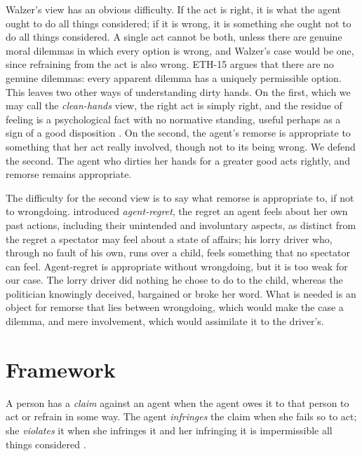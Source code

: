 \documentclass{situationist-preprint}
\begin{document}
Walzer's view has an obvious difficulty. If the act is right, it is what the agent ought to do all things considered; if it is wrong, it is something she ought not to do all things considered. A single act cannot be both, unless there are genuine moral dilemmas in which every option is wrong, and Walzer's case would be one, since refraining from the act is also wrong. ETH-15 argues that there are no genuine dilemmas: every apparent dilemma has a uniquely permissible option. This leaves two other ways of understanding dirty hands. On the first, which we may call the \emph{clean-hands} view, the right act is simply right, and the residue of feeling is a psychological fact with no normative standing, useful perhaps as a sign of a good disposition \citep{Hare1981}. On the second, the agent's remorse is appropriate to something that her act really involved, though not to its being wrong. We defend the second. The agent who dirties her hands for a greater good acts rightly, and remorse remains appropriate.

The difficulty for the second view is to say what remorse is appropriate to, if not to wrongdoing. \citet{Williams1976} introduced \emph{agent-regret}, the regret an agent feels about her own past actions, including their unintended and involuntary aspects, as distinct from the regret a spectator may feel about a state of affairs; his lorry driver who, through no fault of his own, runs over a child, feels something that no spectator can feel. Agent-regret is appropriate without wrongdoing, but it is too weak for our case. The lorry driver did nothing he chose to do to the child, whereas the politician knowingly deceived, bargained or broke her word. What is needed is an object for remorse that lies between wrongdoing, which would make the case a dilemma, and mere involvement, which would assimilate it to the driver's.

\section{Framework}

\begin{definition}\label{d:infringe}
A person has a \emph{claim} against an agent when the agent owes it to that person to act or refrain in some way. The agent \emph{infringes} the claim when she fails so to act; she \emph{violates} it when she infringes it and her infringing it is impermissible all things considered \citep[ch.~3]{Thomson1990}.
\end{definition}
\end{document}
